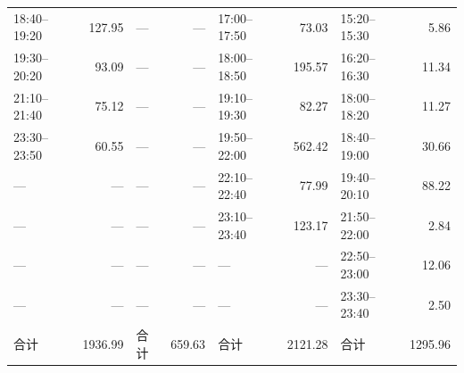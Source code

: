 \begin{table}[H]
\begin{tabular}{@{}lrlrlrlr@{}}
18:40--19:20 & 127.95 & — & — & 17:00--17:50 & 73.03 & 15:20--15:30 & 5.86 \\
19:30--20:20 & 93.09 & — & — & 18:00--18:50 & 195.57 & 16:20--16:30 & 11.34 \\
21:10--21:40 & 75.12 & — & — & 19:10--19:30 & 82.27 & 18:00--18:20 & 11.27 \\
23:30--23:50 & 60.55 & — & — & 19:50--22:00 & 562.42 & 18:40--19:00 & 30.66 \\
— & — & — & — & 22:10--22:40 & 77.99 & 19:40--20:10 & 88.22 \\
— & — & — & — & 23:10--23:40 & 123.17 & 21:50--22:00 & 2.84 \\
— & — & — & — & — & — & 22:50--23:00 & 12.06 \\
— & — & — & — & — & — & 23:30--23:40 & 2.50 \\
合计 & 1936.99 & 合计 & 659.63 & 合计 & 2121.28 & 合计 & 1295.96 \\
\bottomrule
\end{tabular}
\end{table}

\FloatBarrier
